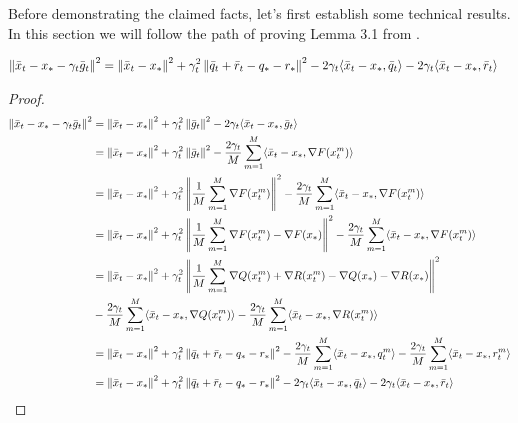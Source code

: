 
Before demonstrating the claimed facts, let's first establish some technical results.
In this section we will follow the path of proving Lemma 3.1 from \cite{Stich}.

\begin{lemma} \label{lem:lem_1}
    \begin{align*}
        \norm{\bar{x}_t - x_* - \gamma_{t} \bar{g}_t}^2
        &= \norm{\bar{x}_t - x_*}^2 
        + \gamma_{t}^2 \norm{\bar{q}_t 
        + \bar{r}_t - q_* - r_*}^2 
        - 2 \gamma_{t} \inner{\bar{x}_t - x_*}{\bar{q}_t}
        - 2 \gamma_{t} \inner{\bar{x}_t - x_*}{\bar{r}_t} 
    \end{align*}
\begin{proof}
    \begin{align*}
        \norm{\bar{x}_t - x_* - \gamma_{t} \bar{g}_t}^2
        &= 
        \norm{\bar{x}_t - x_*}^2 
        + \gamma_{t}^2 \norm{\bar{g}_t}^2 
        - 2 \gamma_{t} \inner{\bar{x}_t - x_*}{\bar{g}_t} \\
        &= 
        \norm{\bar{x}_t - x_*}^2 
        + \gamma_{t}^2 \norm{\bar{g}_t}^2 
        - \frac{2\gamma_{t}}{M} \summ {m=1}{M}{ \inner{\bar{x}_t - x_*}{\nabla F(x^m_t)} } \\
        &= 
        \norm{\bar{x}_t - x_*}^2 
        + \gamma_{t}^2 \norm{\fsumm {m=1}{M}{\nabla F(x^m_t)}}^2 
        - \frac{2\gamma_{t}}{M} \summ {m=1}{M}{ \inner{\bar{x}_t - x_*}{\nabla F(x^m_t)} } \\
        &= 
            \notag
        \norm{\bar{x}_t - x_*}^2 
        + \gamma_{t}^2 \norm{\fsumm {m=1}{M}{\nabla F(x^m_t)} - \nabla F(x_*)}^2 
        - \frac{2\gamma_{t}}{M} \summ {m=1}{M}{ \inner{\bar{x}_t - x_*}{\nabla F(x^m_t)} } \\
        &= 
            \notag
        \norm{\bar{x}_t - x_*}^2 
        + \gamma_{t}^2 \norm{\fsumm {m=1}{M}{\nabla Q(x^m_t) + \nabla R(x^m_t) - \nabla Q(x_*) - \nabla R(x_*)}}^2  \\
        &- \frac{2\gamma_{t}}{M} \summ {m=1}{M}{ \inner{\bar{x}_t - x_*}{\nabla Q(x^m_t)} }
        - \frac{2\gamma_{t}}{M} \summ {m=1}{M}{ \inner{\bar{x}_t - x_*}{\nabla R(x^m_t)} }  \\
        &= 
        \norm{\bar{x}_t - x_*}^2 
        + \gamma_{t}^2 \norm{\bar{q}_t 
        + \bar{r}_t - q_* - r_*}^2  
        - \frac{2\gamma_{t}}{M} \summ {m=1}{M}{ \inner{\bar{x}_t - x_*}{q^m_t} }
        - \frac{2\gamma_{t}}{M} \summ {m=1}{M} { \inner{\bar{x}_t - x_*}{r^m_t} } \\
        &= 
        \norm{\bar{x}_t - x_*}^2 
        + \gamma_{t}^2 \norm{\bar{q}_t 
        + \bar{r}_t - q_* - r_*}^2 
        - 2 \gamma_{t} \inner{\bar{x}_t - x_*}{\bar{q}_t}
        - 2 \gamma_{t} \inner{\bar{x}_t - x_*}{\bar{r}_t} 
    \end{align*}
\end{proof}
\end{lemma}

